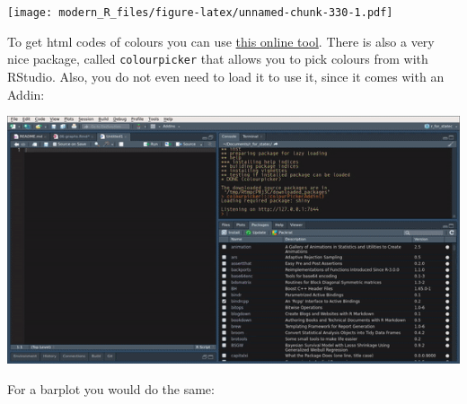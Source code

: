\documentclass[]{gitbook}
\newenvironment{Shaded}{\begin{snugshade}}{\end{snugshade}}
\newcommand{\DataTypeTok}[1]{\textcolor[rgb]{0.13,0.29,0.53}{#1}}
\newcommand{\FloatTok}[1]{\textcolor[rgb]{0.00,0.00,0.81}{#1}}
\newcommand{\KeywordTok}[1]{\textcolor[rgb]{0.13,0.29,0.53}{\textbf{#1}}}
\newcommand{\NormalTok}[1]{#1}
\newcommand{\OperatorTok}[1]{\textcolor[rgb]{0.81,0.36,0.00}{\textbf{#1}}}
\newcommand{\StringTok}[1]{\textcolor[rgb]{0.31,0.60,0.02}{#1}}
\theoremstyle{definition}
\theoremstyle{definition}
\theoremstyle{definition}
\theoremstyle{remark}
\begin{document}
\texttt{[image: modern\_R\_files/figure-latex/unnamed-chunk-330-1.pdf]}

To get html codes of colours you can use
\href{http://htmlcolorcodes.com/color-picker/}{this online tool}. There
is also a very nice package, called \texttt{colourpicker} that allows
you to pick colours from with RStudio. Also, you do not even need to
load it to use it, since it comes with an Addin:

\includegraphics{pics/rstudio_colourpicker.gif}

For a barplot you would do the same:

\begin{Shaded}
\end{Shaded}
\end{document}
